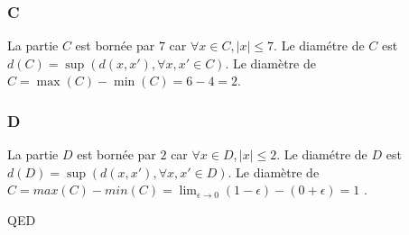 \documentclass[]{book}
\theoremstyle{definition}
\begin{document}
\subsubsection*{C}
La partie $C$ est born\'ee par $7$ car $\forall x \in C, |x| \leq 7$. Le diam\'etre de $C$ est $d(C) = \sup(d(x,x'), \forall x,x' \in C)$. Le diam\`etre de $C = \max(C) - \min(C) = 6 -4 = 2$.  

\subsubsection*{D}
La partie $D$ est born\'ee par $2$ car $\forall x \in D, |x| \leq 2$. Le diam\'etre de $D$ est $d(D) = \sup(d(x,x'), \forall x,x' \in D)$. Le diam\`etre de $C = max(C)-min(C) = \lim_{\epsilon \to 0} (1-\epsilon) - (0+\epsilon) = 1$ .  


QED
\end{document}

